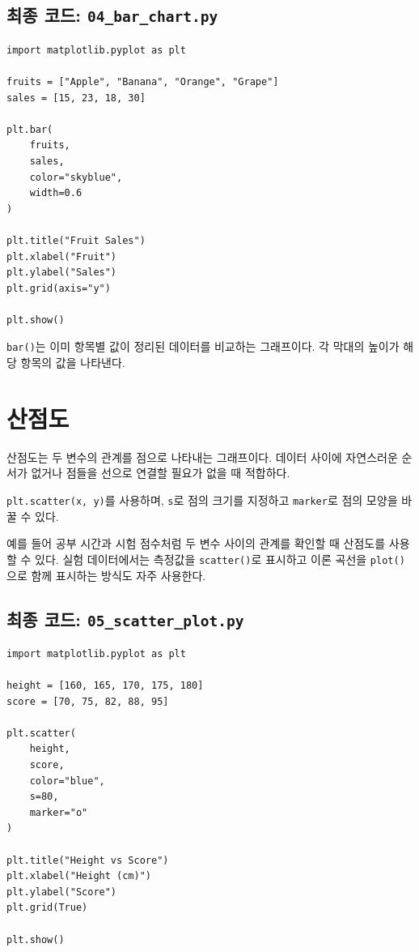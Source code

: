 \documentclass[11pt,a4paper]{article}
\begin{document}
\subsection{최종 코드: \texttt{04\_bar\_chart.py}}

\begin{lstlisting}
import matplotlib.pyplot as plt

fruits = ["Apple", "Banana", "Orange", "Grape"]
sales = [15, 23, 18, 30]

plt.bar(
    fruits,
    sales,
    color="skyblue",
    width=0.6
)

plt.title("Fruit Sales")
plt.xlabel("Fruit")
plt.ylabel("Sales")
plt.grid(axis="y")

plt.show()
\end{lstlisting}

\begin{importantbox}
\texttt{bar()}는 이미 항목별 값이 정리된 데이터를 비교하는 그래프이다. 각 막대의 높이가 해당 항목의 값을 나타낸다.
\end{importantbox}

\section{산점도}

산점도는 두 변수의 관계를 점으로 나타내는 그래프이다. 데이터 사이에 자연스러운 순서가 없거나 점들을 선으로 연결할 필요가 없을 때 적합하다.

\texttt{plt.scatter(x, y)}를 사용하며, \texttt{s}로 점의 크기를 지정하고 \texttt{marker}로 점의 모양을 바꿀 수 있다.

예를 들어 공부 시간과 시험 점수처럼 두 변수 사이의 관계를 확인할 때 산점도를 사용할 수 있다. 실험 데이터에서는 측정값을 \texttt{scatter()}로 표시하고 이론 곡선을 \texttt{plot()}으로 함께 표시하는 방식도 자주 사용한다.

\subsection{최종 코드: \texttt{05\_scatter\_plot.py}}

\begin{lstlisting}
import matplotlib.pyplot as plt

height = [160, 165, 170, 175, 180]
score = [70, 75, 82, 88, 95]

plt.scatter(
    height,
    score,
    color="blue",
    s=80,
    marker="o"
)

plt.title("Height vs Score")
plt.xlabel("Height (cm)")
plt.ylabel("Score")
plt.grid(True)

plt.show()
\end{lstlisting}
\end{document}
